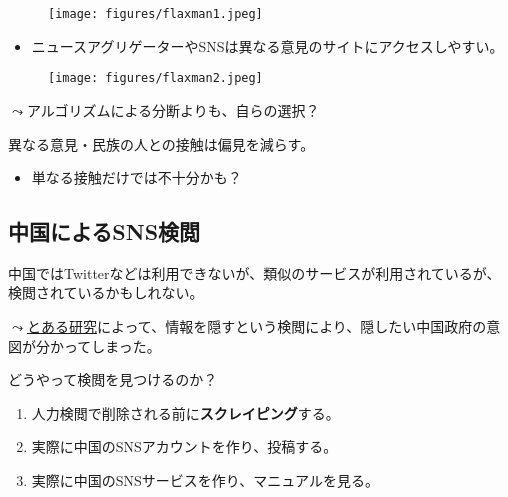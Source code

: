 \documentclass[
  xelatex,
  ja=standard]{bxjsarticle}
\providecommand{\tightlist}{%
  \setlength{\itemsep}{0pt}\setlength{\parskip}{0pt}}\usepackage{longtable,booktabs,array}
\begin{document}
\begin{figure}[htpb]

{\centering \texttt{[image: figures/flaxman1.jpeg]}

}

\caption{\citet{flaxman2016}}

\end{figure}

\begin{itemize}
\tightlist
\item
  ニュースアグリゲーターやSNSは異なる意見のサイトにアクセスしやすい。
\end{itemize}

\begin{figure}[htpb]

{\centering \texttt{[image: figures/flaxman2.jpeg]}

}

\caption{\citet{flaxman2016}}

\end{figure}

\(\leadsto\)アルゴリズムによる分断よりも、自らの選択？

異なる意見・民族の人との接触は偏見を減らす\citep{paluck2019}。

\begin{itemize}
\tightlist
\item
  単なる接触だけでは不十分かも？
\end{itemize}

\hypertarget{ux4e2dux56fdux306bux3088ux308bsnsux691cux95b2}{%
\subsection{中国によるSNS検閲}\label{ux4e2dux56fdux306bux3088ux308bsnsux691cux95b2}}

中国ではTwitterなどは利用できないが、類似のサービスが利用されているが、検閲されているかもしれない。

\(\leadsto\)\href{https://ipsj.ixsq.nii.ac.jp/ej/?action=pages_view_main\&active_action=repository_view_main_item_detail\&item_id=199708\&item_no=1\&page_id=13\&block_id=8}{とある研究}によって、情報を隠すという検閲により、隠したい中国政府の意図が分かってしまった。

どうやって検閲を見つけるのか？

\begin{enumerate}
\def\labelenumi{\arabic{enumi}.}
\tightlist
\item
  人力検閲で削除される前に\textbf{スクレイピング}する。
\item
  実際に中国のSNSアカウントを作り、投稿する。
\item
  実際に中国のSNSサービスを作り、マニュアルを見る。
\end{enumerate}
\end{document}

